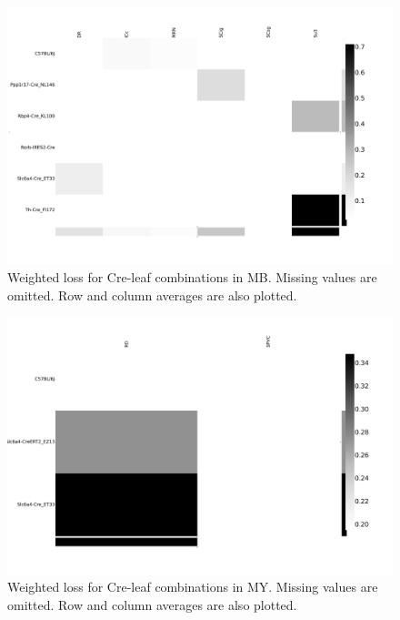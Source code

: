 \begin{figure}[H]
    \centering
    \includegraphics[width = 7in]{figs/lossdetails_313.png} 
    \caption{Weighted loss for Cre-leaf combinations in MB. Missing values are omitted.   Row and column averages are also plotted.}
\end{figure}

\begin{figure}[H]
    \centering
    \includegraphics[width = 7in]{figs/lossdetails_354.png} 
    \caption{Weighted loss for Cre-leaf combinations in MY. Missing values are omitted.   Row and column averages are also plotted.}
\end{figure}

